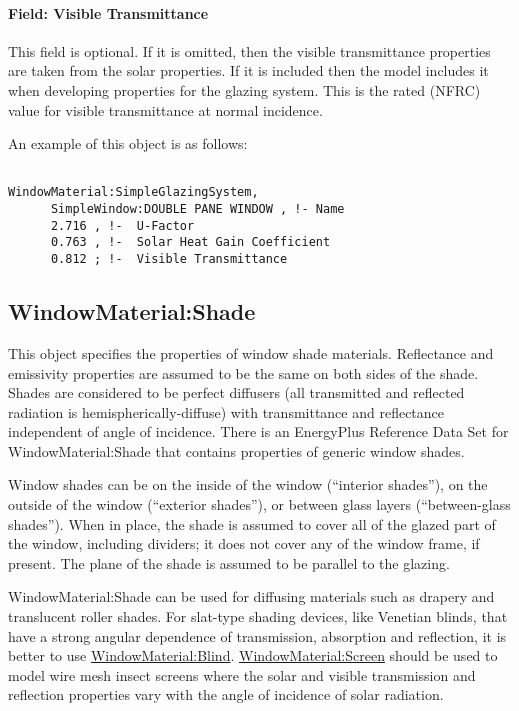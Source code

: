 \paragraph{Field: Visible Transmittance}\label{field-visible-transmittance}

This field is optional. If it is omitted, then the visible transmittance properties are taken from the solar properties. If it is included then the model includes it when developing properties for the glazing system. This is the rated (NFRC) value for visible transmittance at normal incidence.

An example of this object is as follows:

\begin{lstlisting}

WindowMaterial:SimpleGlazingSystem,
      SimpleWindow:DOUBLE PANE WINDOW , !- Name
      2.716 , !-  U-Factor
      0.763 , !-  Solar Heat Gain Coefficient
      0.812 ; !-  Visible Transmittance
\end{lstlisting}

\subsection{WindowMaterial:Shade}\label{windowmaterialshade}

This object specifies the properties of window shade materials. Reflectance and emissivity properties are assumed to be the same on both sides of the shade. Shades are considered to be perfect diffusers (all transmitted and reflected radiation is hemispherically-diffuse) with transmittance and reflectance independent of angle of incidence. There is an EnergyPlus Reference Data Set for WindowMaterial:Shade that contains properties of generic window shades.

Window shades can be on the inside of the window (``interior shades''), on the outside of the window (``exterior shades''), or between glass layers (``between-glass shades''). When in place, the shade is assumed to cover all of the glazed part of the window, including dividers; it does not cover any of the window frame, if present. The plane of the shade is assumed to be parallel to the glazing.

WindowMaterial:Shade can be used for diffusing materials such as drapery and translucent roller shades. For slat-type shading devices, like Venetian blinds, that have a strong angular dependence of transmission, absorption and reflection, it is better to use \hyperref[windowmaterialblind]{WindowMaterial:Blind}. \hyperref[windowmaterialscreen]{WindowMaterial:Screen} should be used to model wire mesh insect screens where the solar and visible transmission and reflection properties vary with the angle of incidence of solar radiation.

